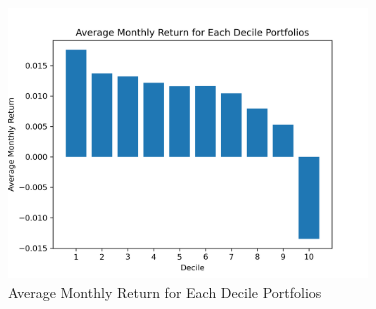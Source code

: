 \begin{figure}[h]
\centering
\includegraphics[width=0.85\textwidth]{data/q2_graph.png}
\caption{Average Monthly Return for Each Decile Portfolios}
\label{fig:example}
\end{figure}


\vspace{6mm}
